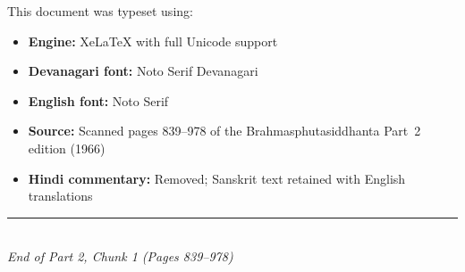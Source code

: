 \documentclass[11pt,a4paper]{book}
\begin{document}
This document was typeset using:
\begin{itemize}
\item \textbf{Engine:} XeLaTeX with full Unicode support
\item \textbf{Devanagari font:} Noto Serif Devanagari
\item \textbf{English font:} Noto Serif
\item \textbf{Source:} Scanned pages 839--978 of the Brahmasphutasiddhanta Part~2 edition (1966)
\item \textbf{Hindi commentary:} Removed; Sanskrit text retained with English translations
\end{itemize}

\vspace{1cm}
\begin{center}
\rule{0.4\textwidth}{0.5pt}\\[0.5cm]
{\small\textit{End of Part 2, Chunk 1 (Pages 839--978)}}
\end{center}
\end{document}
